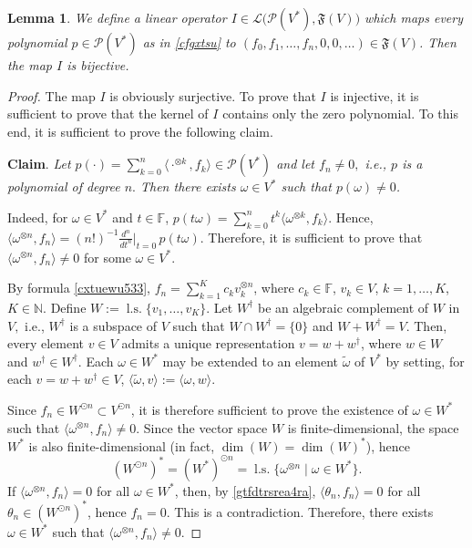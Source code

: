 \documentclass[12pt]{article}
\newtheorem{lemma}[theorem]{Lemma}
\theoremstyle{remark}
\theoremstyle{remark}
\theoremstyle{remark}
\begin{document}
\begin{lemma}\label{equation7867900}
We define a linear operator $I\in\mathcal L\big(\mathcal P(V^*),\mathfrak F(V)\big)$ which maps every polynomial $p\in\mathcal P(V^*)$ as in \eqref{cfgxtsu} to $(f_0,f_1,\dots,f_n,0,0,\dots)\in\mathfrak F(V)$. Then the map $I$ is bijective. 
\end{lemma}
 
 \begin{proof} The map $I$ is obviously surjective. To prove that $I$ is injective, it is sufficient to prove that the kernel of $I$ contains only the zero polynomial. To this end, it is sufficient to prove the following claim.
 
 {\bf Claim}.
{\it  Let $p(\cdot)=\sum_{k=0}^n\langle \cdot^{\otimes k}, f_k\rangle \in\mathcal P    (V^*)$ and let $f_n\neq 0,$ i.e., $p$ is a polynomial of degree $n.$ Then there exists $\omega \in V^*$ such that $p(\omega)\neq 0$.}

Indeed, for $\omega\in V^*$ and $t\in\mathbb{F}$, $p(t\omega)=\sum_{k=0}^nt^{k}\langle \omega^{\otimes k}, f_k\rangle$. Hence,
$\langle \omega^{\otimes n}, f_n\rangle=(n!)^{-1}\frac{d^n}{dt^n}\big\rvert_{t = 0}\,p(t\omega)$.
 Therefore, it is sufficient to prove that $\langle \omega^{\otimes n}, f_n\rangle\ne0$ for some $\omega\in V^*$.

 By formula \eqref{cxtuewu533}, $f_n=\sum_{k=1}^Kc_kv_k^{\otimes n}$, where $c_k\in \mathbb{F}$, $v_k\in V$, $k=1,\dots,K$, $K\in \mathbb N$.
Define $W:=\operatorname{l.s.}\{v_1,\dots,v_K\}$.  
Let $W^\dag$ be an algebraic complement of $W$ in $V,$ i.e., $W^\dag$ is a subspace of $V$ such that $W\cap W^\dag=\{0\}$ and $W+W^\dag=V$. Then, every element $v\in V$ admits a unique representation 
$v=w+w^\dag$, where $w\in W$ and $w^\dag\in W^\dag$. 
Each $\omega\in W^*$ may be extended to an element $\tilde \omega$ of $V^*$ by setting, for each $v=w+w^\dag\in V$,
$\langle \tilde \omega, v\rangle:=\langle \omega, w\rangle$. 

Since $f_n\in W^{\odot n}\subset V^{\odot n}$, it is therefore sufficient to prove the existence of $\omega\in W^*$ such that $\langle \omega^{\otimes n},f_n\rangle\ne0$. Since the vector space $W$ is finite-dimensional, the space $W^*$ is also  finite-dimensional (in fact, $\operatorname{dim}(W)=\operatorname{dim}(W)^*$), hence 
\begin{equation}\label{gtfdtrsrea4ra}
(W^{\odot n})^*=(W^*)^{\odot n}=\operatorname{l.s.}\{\omega^{\otimes n}\mid\omega\in W^* \}.
\end{equation}
 If $\langle\omega^{\otimes n},f_n\rangle=0$ for all $\omega\in W^*$, then, by \eqref{gtfdtrsrea4ra}, $\langle\theta_n,f_n\rangle=0$ for all $\theta_n\in (W^{\odot n})^*$, hence $f_n=0$. This is a contradiction. Therefore, there exists $\omega\in W^*$ such that $\langle\omega^{\otimes n},f_n\rangle\ne0$. 
\end{proof} 
\end{document}
